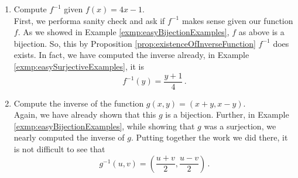 \guard




\begin{exmp}
\label{exmp:easyInverseExamples}
  \begin{enumerate}
    \item Compute $f^{-1}$ given $f(x) = 4x-1$.\\

    First, we performa sanity check and ask if $f^{-1}$ makes sense given our function $f$.
    As we showed in Example \ref{exmp:easyBijectionExamples}, $f$ as above is a bijection.
    So, this by Proposition \ref{prop:existenceOfInverseFunction} $f^{-1}$ does exists.
    In fact, we have computed the inverse already, in Example \ref{exmp:easySurjectiveExamples}, it is \[ f^{-1}(y) = \frac{y+1}{4}\,.\]

    \item Compute the inverse of the function $g(x,y) = (x+y,x-y)$.\\

    Again, we have already shown that this $g$ is a bijection.
    Further, in Example \ref{exmp:easyBijectionExamples}, while showing that $g$ was a surjection, we nearly computed the inverse of $g$.
    Putting together the work we did there, it is not difficult to see that \[ g^{-1}(u,v) = \left( \frac{ u+v}{2}, \frac{u-v}{2} \right)\,.\]

  \end{enumerate}

\end{exmp}
